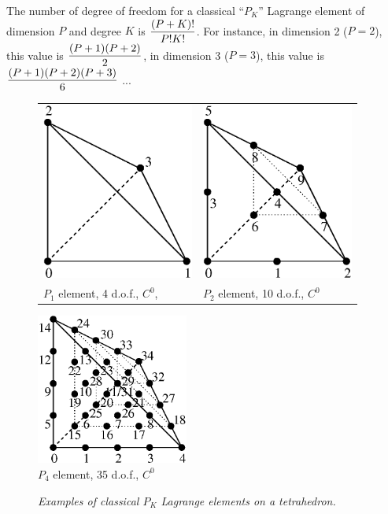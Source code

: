 \documentclass[11pt,a4paper]{article}
\begin{document}
The number of degree of freedom for a classical ``$P_K$'' Lagrange element of dimension $P$ and degree $K$ is ${\displaystyle \frac{\displaystyle (P+K)!}{\displaystyle P!K!}}$. For instance, in dimension 2 ($P = 2$), this value is ${\displaystyle \frac{\displaystyle (P+1) (P+2)}{\displaystyle 2}}$, in dimension 3 ($P = 3$), this value is ${\displaystyle \frac{\displaystyle (P+1) (P+2) (P+3)}{\displaystyle 6}}$ ...

\begin{figure}[H]
  \begin{center}
    \begin{tabular}{m{7cm}m{7cm}}
      \includegraphics[width=5cm,angle=0]{getfemlist_tetrahedron_P1.eps} & \includegraphics[width=5cm,angle=0]{getfemlist_tetrahedron_P2.eps} \\
      $P_1$ element, 4 d.o.f., $C^0$, & $P_2$ element, 10 d.o.f., $C^0$
    \end{tabular}
     \includegraphics[width=5cm,angle=0]{getfemlist_tetrahedron_P4.eps} \\
     $P_4$ element, 35 d.o.f., $C^0$
  \end{center}
  \caption{ \it Examples of classical $P_K$ Lagrange elements on a tetrahedron.} \label{fig:tetrahedronpk}
\end{figure}
\end{document}

